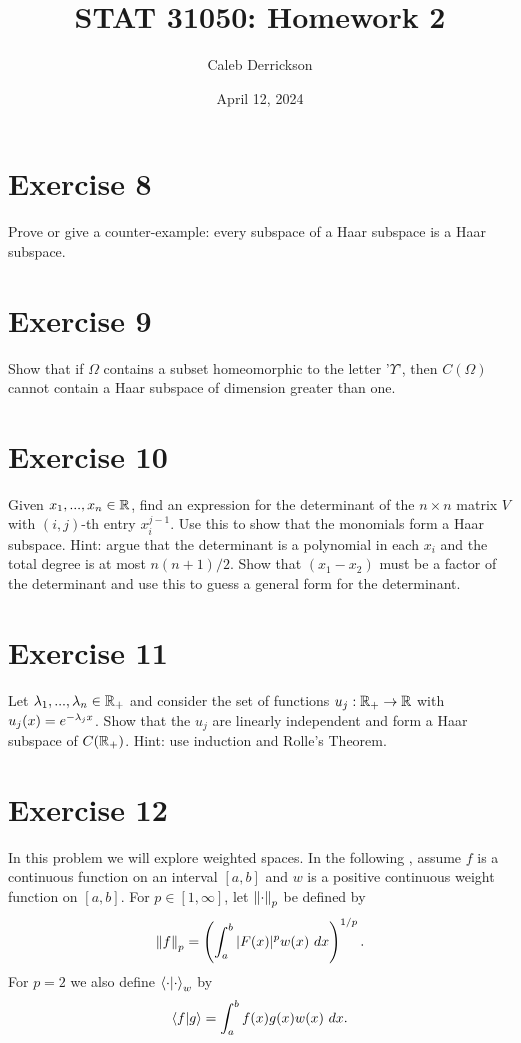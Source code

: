 

\title{STAT 31050: Homework 2}
\author{Caleb Derrickson}
\date{April 12, 2024}


\onehalfspacing
\maketitle
\allowdisplaybreaks
\tableofcontents

\newpage
\section{Exercise 8}
Prove or give a counter-example: every subspace of a Haar subspace is a Haar subspace.

\newpage
\section{Exercise 9}
Show that if $\Omega$ contains a subset homeomorphic to the letter '$\Upsilon$', then $C(\Omega)$ cannot contain a Haar subspace of dimension greater than one.

\newpage
\section{Exercise 10}
Given $x_1, ..., x_n \in \mathbb{R}$, find an expression for the determinant of the $n\times n$ matrix $V$ with $(i, j)$-th entry $x_i^{j-1}$. Use this to show that the monomials form a Haar subspace. Hint: argue that the determinant is a polynomial in each $x_i$ and the total degree is at most $n(n+1)/2$. Show that $(x_1 - x_2)$ must be a factor of the determinant and use this to guess a general form for the determinant.

\newpage
\section{Exercise 11}
Let $\mathrm{\lambda}_1, ..., \mathrm{\lambda}_n \in \mathbb{R}_+$ and consider the set of functions $u_j: \mathbb{R}_+ \to \mathbb{R}$ with $u_j(x) = e^{-\mathrm{\lambda}_j x}$. Show that the $u_j$ are linearly independent and form a Haar subspace of $C(\mathbb{R}_+)$. Hint: use induction and Rolle's Theorem. 

\newpage
\section{Exercise 12}
In this problem we will explore weighted spaces. In the following , assume $f$ is a continuous function on an interval $[a, b]$ and $w$ is a positive continuous weight function on $[a, b]$. For $p \in [1, \infty]$, let $\norm{\cdot}_p$ be defined by 
\[\norm{f}_p = \left(\int_a^b |F(x)|^p w(x) \ dx\right)^{1/p}.\]
For $p = 2$ we also define $\braket{\cdot}{\cdot}_w$ by 
\[\braket{f}{g} = \int_a^b f(x)g(x) w(x) \ dx.\]

